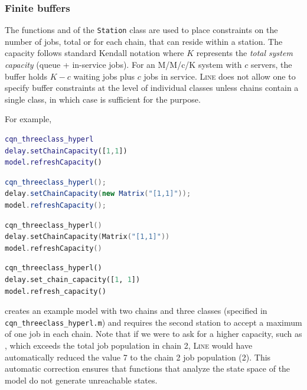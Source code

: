 \subsubsection{Finite buffers}
The functions  and  of the \texttt{Station} class are used to place constraints on the number of jobs, total or for each chain, that can reside within a station. The capacity follows standard Kendall notation where $K$ represents the \emph{total system capacity} (queue + in-service jobs). For an M/M/c/K system with $c$ servers, the buffer holds $K-c$ waiting jobs plus $c$ jobs in service. \textsc{Line} does not allow one to specify buffer constraints at the level of individual classes unless chains contain a single class, in which case  is sufficient for the purpose.

For example,
\begin{MATLAB}
\begin{lstlisting}[language = matlab]
cqn_threeclass_hyperl
delay.setChainCapacity([1,1])
model.refreshCapacity()
\end{lstlisting}
\end{MATLAB}
\begin{JAVA}
\begin{lstlisting}[language=java, basicstyle=\ttfamily\scriptsize]
cqn_threeclass_hyperl();
delay.setChainCapacity(new Matrix("[1,1]"));
model.refreshCapacity();
\end{lstlisting}
\end{JAVA}
\begin{KOTLIN}
\begin{lstlisting}[language=kotlin, basicstyle=\ttfamily\scriptsize]
cqn_threeclass_hyperl()
delay.setChainCapacity(Matrix("[1,1]"))
model.refreshCapacity()
\end{lstlisting}
\end{KOTLIN}
\begin{PYTHON}
\begin{lstlisting}[language = python]
cqn_threeclass_hyperl()
delay.set_chain_capacity([1, 1])
model.refresh_capacity()
\end{lstlisting}
\end{PYTHON}
creates an example model with two chains and three classes (specified in \texttt{cqn\_threeclass\_hyperl.m}) and requires the second station to accept a maximum of one job in each chain. Note that if we were to ask for a higher capacity, such as , which exceeds the total job population in chain 2, \textsc{Line} would have automatically reduced the value 7 to the chain 2 job population (2). This automatic correction ensures that functions that analyze the state space of the model do not generate unreachable states.

